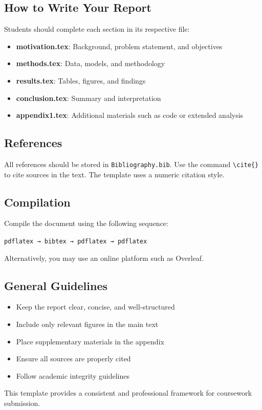 \subsection*{How to Write Your Report}
Students should complete each section in its respective file:
\begin{itemize}
    \item \textbf{motivation.tex}: Background, problem statement, and objectives
    \item \textbf{methods.tex}: Data, models, and methodology
    \item \textbf{results.tex}: Tables, figures, and findings
    \item \textbf{conclusion.tex}: Summary and interpretation
    \item \textbf{appendix1.tex}: Additional materials such as code or extended analysis
\end{itemize}

\subsection*{References}
All references should be stored in \texttt{Bibliography.bib}. Use the command \texttt{\textbackslash cite\{\}} to cite sources in the text. The template uses a numeric citation style.

\subsection*{Compilation}
Compile the document using the following sequence:
\begin{center}
\texttt{pdflatex → bibtex → pdflatex → pdflatex}
\end{center}
Alternatively, you may use an online platform such as Overleaf.

\subsection*{General Guidelines}
\begin{itemize}
    \item Keep the report clear, concise, and well-structured
    \item Include only relevant figures in the main text
    \item Place supplementary materials in the appendix
    \item Ensure all sources are properly cited
    \item Follow academic integrity guidelines
\end{itemize}

This template provides a consistent and professional framework for coursework submission.

\newpage